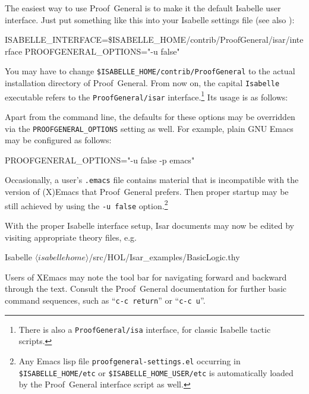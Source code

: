 The easiest way to use Proof~General is to make it the default Isabelle user
interface.  Just put something like this into your Isabelle settings file (see
also \cite{isabelle-sys}):
\begin{ttbox}
ISABELLE_INTERFACE=\$ISABELLE_HOME/contrib/ProofGeneral/isar/interface
PROOFGENERAL_OPTIONS="-u false"
\end{ttbox}
You may have to change \texttt{\$ISABELLE_HOME/contrib/ProofGeneral} to the
actual installation directory of Proof~General.  From now on, the capital
\texttt{Isabelle} executable refers to the \texttt{ProofGeneral/isar}
interface.\footnote{There is also a \texttt{ProofGeneral/isa} interface, for
  classic Isabelle tactic scripts.}  Its usage is as follows:
Apart from the command line, the defaults for these options may be overridden
via the \texttt{PROOFGENERAL_OPTIONS} setting as well.  For example, plain GNU
Emacs may be configured as follows:
\begin{ttbox}
PROOFGENERAL_OPTIONS="-u false -p emacs"
\end{ttbox}

Occasionally, a user's \texttt{.emacs} file contains material that is
incompatible with the version of (X)Emacs that Proof~General prefers.  Then
proper startup may be still achieved by using the \texttt{-u false}
option.\footnote{Any Emacs lisp file \texttt{proofgeneral-settings.el}
  occurring in \texttt{\$ISABELLE_HOME/etc} or
  \texttt{\$ISABELLE_HOME_USER/etc} is automatically loaded by the
  Proof~General interface script as well.}

\medskip

With the proper Isabelle interface setup, Isar documents may now be edited by
visiting appropriate theory files, e.g.\ 
\begin{ttbox}
Isabelle \({\langle}isabellehome{\rangle}\)/src/HOL/Isar_examples/BasicLogic.thy
\end{ttbox}
Users of XEmacs may note the tool bar for navigating forward and backward
through the text.  Consult the Proof~General documentation \cite{proofgeneral}
for further basic command sequences, such as ``\texttt{c-c return}'' or
``\texttt{c-c u}''.


